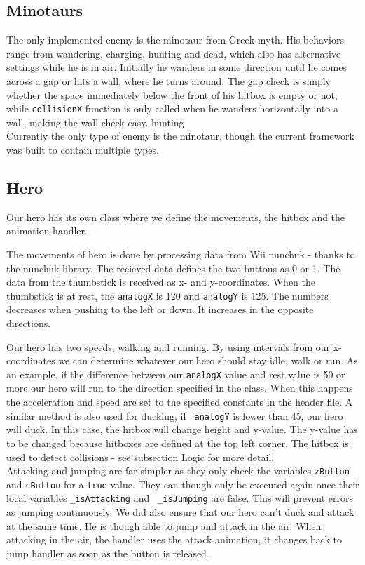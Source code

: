 \subsection{Minotaurs} %
The only implemented enemy is the minotaur from Greek myth. His behaviors range from wandering, charging, hunting and dead, which also has alternative settings while he is in air. Initially he wanders in some direction until he comes across a gap or hits a wall, where he turns around. The gap check is simply whether the space immediately below the front of his hitbox is empty or not, while {\tt collisionX} function is only called when he wanders horizontally into a wall, making the wall check easy.
hunting\\
Currently the only type of enemy is the minotaur, though the current framework was built to contain multiple types.

\subsection{Hero}
Our hero has its own class where we define the movements, the hitbox and
the animation handler.

The movements of hero is done by processing data from Wii
nunchuk - thanks to the nunchuk library. The recieved data defines the two
buttons as 0 or 1.  The data from the thumbstick is received as x- and
y-coordinates. When the thumbstick is at rest, the {\tt analogX} is 120 and
{\tt analogY} is 125.  The numbers decreases when pushing to the left or down.
It increases in the opposite directions.

Our hero has two speeds, walking and running. By using intervals from our
x-coordinates we can determine whatever our hero should stay idle, walk or run.
As an example, if the difference between our {\tt analogX} value and rest value
is 50 or more our hero will run to the direction specified in the class. When
this happens the acceleration and speed are set to the specified constants
in the header file.  A similar method is also used for ducking, if {\tt
analogY} is lower than 45, our hero will duck. In this case, the hitbox will
change height and y-value. The y-value has to be changed because hitboxes are
defined at the top left corner. The hitbox is used to detect collisions - see subsection
Logic for more detail.
\\

Attacking and jumping are far simpler as they only check the
variables {\tt zButton} and {\tt cButton} for a {\tt true} value. They can though only
be executed again once their local variables {\tt \_isAttacking} and {\tt
\_isJumping} are false. This will prevent errors as jumping
continuously. We did also ensure that our hero can't duck and attack at the same
time. He is though able to jump and attack in the air. When attacking in the air,
the handler uses the attack animation, it changes back to jump handler as soon as
the button is released.

